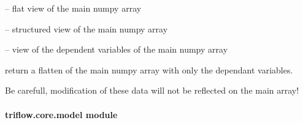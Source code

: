 \documentclass[letterpaper,10pt,english]{sphinxmanual}
\begin{document}
\begin{fulllineitems}
\begin{fulllineitems}
\end{fulllineitems}


\begin{fulllineitems}
\label{\detokenize{triflow.core:triflow.core.fields.BaseFields.flat}}
 -- flat view of the main numpy array

\end{fulllineitems}


\begin{fulllineitems}
\label{\detokenize{triflow.core:triflow.core.fields.BaseFields.structured}}
 -- structured view of the main numpy array

\end{fulllineitems}


\begin{fulllineitems}
\label{\detokenize{triflow.core:triflow.core.fields.BaseFields.uarray}}
 -- view of the dependent variables of the main numpy array

\end{fulllineitems}


\begin{fulllineitems}
\label{\detokenize{triflow.core:triflow.core.fields.BaseFields.uflat}}
return a flatten  of the main numpy array with only the
dependant variables.

Be carefull, modification of these data will not be reflected on
the main array!

\end{fulllineitems}


\end{fulllineitems}



\paragraph{triflow.core.model module}
\label{\detokenize{triflow.core:triflow-core-model-module}}\label{\detokenize{triflow.core:module-triflow.core.model}}
\end{document}
